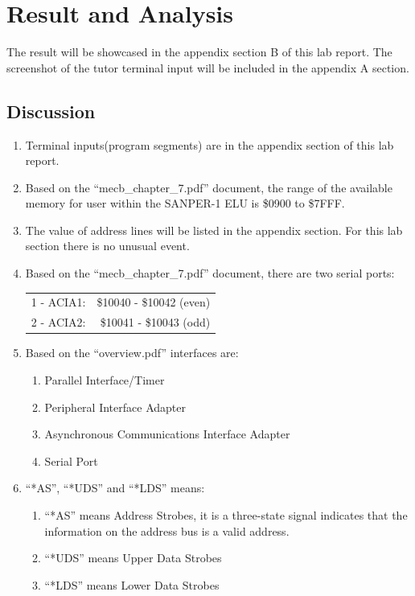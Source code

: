 \documentclass{article}
\begin{document}

\section{Result and Analysis}
The result will be showcased in the appendix section B of this lab report. The screenshot of the tutor terminal input will be included in the appendix A section.
	\subsection{Discussion}
		\begin{enumerate}[label=(\arabic*)]
			\item Terminal inputs(program segments) are in the appendix section of this lab report.
			\item Based on the ``mecb\_chapter\_7.pdf'' document, the range of the available memory for user within the SANPER-1 ELU is \$0900 to \$7FFF.
			\item The value of address lines will be listed in the appendix section. For this lab section there is no unusual event. 
			\item Based on the ``mecb\_chapter\_7.pdf'' document, there are two serial ports: 
					\begin{tabular}{l r}
						1 - ACIA1: & \$10040 - \$10042 (even) \\
						2 - ACIA2: & \$10041 - \$10043 (odd)\\
					\end{tabular}
			\item Based on the ``overview.pdf'' interfaces are:
				\begin{enumerate}[label=(\alph*)]
						\item Parallel Interface/Timer
						\item Peripheral Interface Adapter
						\item Asynchronous Communications Interface Adapter
						\item Serial Port
				\end{enumerate}
			\item ``*AS'', ``*UDS'' and ``*LDS'' means:
				\begin{enumerate}[label=(\alph*)]
					\item ``*AS'' means Address Strobes, it is a three-state signal indicates that the information on the address bus is a valid address.
					\item ``*UDS'' means Upper Data Strobes
					\item ``*LDS'' means Lower Data Strobes
				\end{enumerate}
		\end{enumerate}
\end{document}
